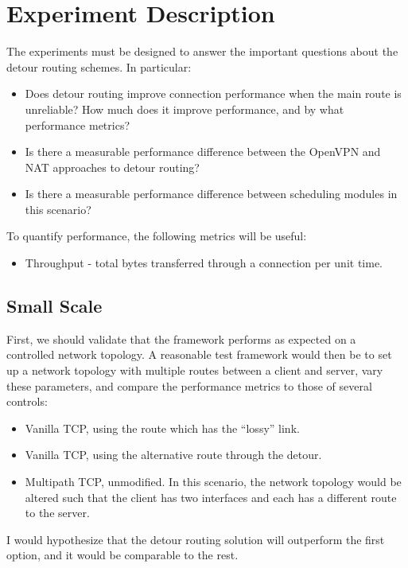 \documentclass{article}
\begin{document}
\section{Experiment Description}

The experiments must be designed to answer the important questions about the
detour routing schemes. In particular:

\begin{itemize}
\item Does detour routing improve connection performance when the main route is
  unreliable? How much does it improve performance, and by what performance
  metrics?
\item Is there a measurable performance difference between the OpenVPN and NAT
  approaches to detour routing?
\item Is there a measurable performance difference between scheduling modules in
  this scenario?
\end{itemize}

To quantify performance, the following metrics will be useful:
\begin{itemize}
\item Throughput - total bytes transferred through a connection per unit time.
\end{itemize}

\subsection{Small Scale}

First, we should validate that the framework performs as expected on a
controlled network topology. A reasonable test framework would then be to set up
a network topology with multiple routes between a client and server, vary these
parameters, and compare the performance metrics to those of several controls:

\begin{itemize}
\item Vanilla TCP, using the route which has the ``lossy'' link.
\item Vanilla TCP, using the alternative route through the detour.
\item Multipath TCP, unmodified. In this scenario, the network topology would be
  altered such that the client has two interfaces and each has a different route
  to the server.
\end{itemize}

I would hypothesize that the detour routing solution will outperform the first
option, and it would be comparable to the rest.
\end{document}
